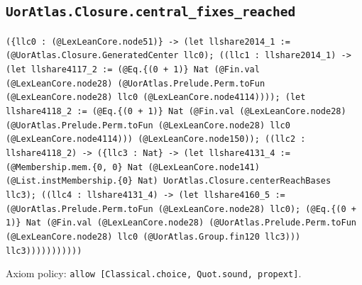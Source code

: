 \documentclass[11pt]{article}
\begin{document}
\subsection*{\texttt{UorAtlas.Closure.central\_fixes\_reached}}
\noindent\texttt{(\{llc0 : (@LexLeanCore.node51)\} -> (let llshare2014\_1 := (@UorAtlas.Closure.GeneratedCenter llc0); ((llc1 : llshare2014\_1) -> (let llshare4117\_2 := (@Eq.\{(0 + 1)\} Nat (@Fin.val (@LexLeanCore.node28) (@UorAtlas.Prelude.Perm.toFun (@LexLeanCore.node28) llc0 (@LexLeanCore.node4114)))); (let llshare4118\_2 := (@Eq.\{(0 + 1)\} Nat (@Fin.val (@LexLeanCore.node28) (@UorAtlas.Prelude.Perm.toFun (@LexLeanCore.node28) llc0 (@LexLeanCore.node4114))) (@LexLeanCore.node150)); ((llc2 : llshare4118\_2) -> (\{llc3 : Nat\} -> (let llshare4131\_4 := (@Membership.mem.\{0, 0\} Nat (@LexLeanCore.node141) (@List.instMembership.\{0\} Nat) UorAtlas.Closure.centerReachBases llc3); ((llc4 : llshare4131\_4) -> (let llshare4160\_5 := (@UorAtlas.Prelude.Perm.toFun (@LexLeanCore.node28) llc0); (@Eq.\{(0 + 1)\} Nat (@Fin.val (@LexLeanCore.node28) (@UorAtlas.Prelude.Perm.toFun (@LexLeanCore.node28) llc0 (@UorAtlas.Group.fin120 llc3))) llc3)))))))))))}\par
\noindent Axiom policy: \texttt{allow [Classical.choice, Quot.sound, propext]}.\par
\end{document}
